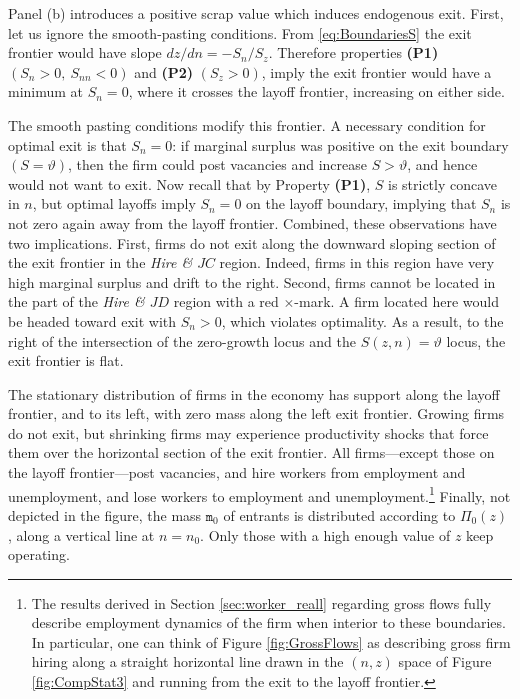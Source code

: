 Panel (b) introduces a positive scrap value which induces endogenous exit.
First, let us ignore the smooth-pasting conditions.
From  \eqref{eq:BoundariesS} the exit frontier would have slope ${dz}/{dn}= -{S_{n}}/{S_{z}}$.
Therefore properties \textbf{(P1)} $(S_{n}>0,\:S_{nn}<0)$ and \textbf{(P2)} $(S_{z}>0)$, imply the exit frontier would have a minimum at $S_n=0$, where it crosses the layoff frontier, increasing on either side.

The smooth pasting conditions modify this frontier.
A necessary condition for optimal exit is that $S_n=0$: if marginal surplus was positive on the exit boundary $(S=\vartheta)$, then the firm could post vacancies and increase $S>\vartheta$, and hence would not want to exit.
Now recall that by Property \textbf{(P1)}, $S$ is strictly concave in $n$, but optimal layoffs imply $S_n=0$ on the layoff boundary, implying that $S_n$ is not zero again away from the layoff frontier.
Combined, these observations have two implications.
First, firms do not exit along the downward sloping section of the exit frontier in the \emph{Hire \& $JC$} region.
Indeed, firms in this region have very high marginal surplus and drift to the right.
Second, firms cannot be located in the part of the \emph{Hire \& $JD$} region with a red $\times$-mark.
A firm located here would be headed toward exit with $S_n>0$, which violates optimality.
As a result, to the right of the intersection of the zero-growth locus and the $S(z,n)=\vartheta$ locus, the exit frontier is flat.

The stationary distribution of firms in the economy has support along the layoff frontier, and to its left, with
zero mass along the left exit frontier.
Growing firms do not exit, but shrinking firms may experience productivity shocks that force them over the horizontal section of the exit frontier.
All firms---except those on the layoff frontier---post vacancies, and hire workers from employment and unemployment, and lose workers to employment and unemployment.\footnote{The results derived in Section \ref{sec:worker_reall} regarding gross flows fully describe employment dynamics of the firm when interior to these boundaries. In particular, one can think of Figure \ref{fig:GrossFlows} as describing gross firm hiring along a straight horizontal line drawn in the $(n,z)$ space of Figure \ref{fig:CompStat3} and running from the exit to the layoff frontier.} Finally, not depicted in the figure, the mass $\texttt{m}_0$ of entrants is distributed according to $\Pi_0(z)$, along a vertical line at $n=n_0$.
Only those with a high enough value of $z$ keep operating.

